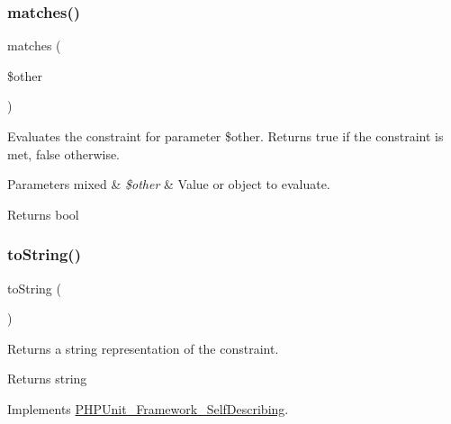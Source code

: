 \subsubsection{\texorpdfstring{matches()}{matches()}}
{\footnotesize\ttfamily matches (\begin{DoxyParamCaption}\item[{}]{\$other }\end{DoxyParamCaption})\hspace{0.3cm}{\ttfamily [protected]}}

Evaluates the constraint for parameter \$other. Returns true if the constraint is met, false otherwise.


\begin{DoxyParams}[1]{Parameters}
mixed & {\em \$other} & Value or object to evaluate.\\
\hline
\end{DoxyParams}
\begin{DoxyReturn}{Returns}
bool 
\end{DoxyReturn}
\mbox{\label{class_p_h_p_unit___framework___constraint___string_starts_with_a5558c5d549f41597377fa1ea8a1cefa3}} 
\subsubsection{\texorpdfstring{to\+String()}{toString()}}
{\footnotesize\ttfamily to\+String (\begin{DoxyParamCaption}{ }\end{DoxyParamCaption})}

Returns a string representation of the constraint.

\begin{DoxyReturn}{Returns}
string 
\end{DoxyReturn}


Implements \mbox{\hyperlink{interface_p_h_p_unit___framework___self_describing_a5558c5d549f41597377fa1ea8a1cefa3}{P\+H\+P\+Unit\+\_\+\+Framework\+\_\+\+Self\+Describing}}.



